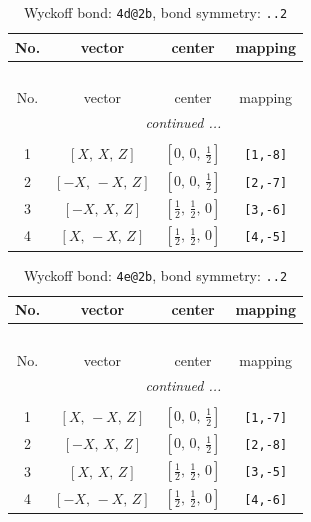 \documentclass[fleqn,8pt]{jsarticle}
\begin{document}
\begin{longtable}{cccc}
\caption{Wyckoff bond: {\tt 4d@2b}, bond symmetry: {\tt ..2}}
 \\
 \hline \hline
No. & vector & center & mapping \\ \hline \endfirsthead

\multicolumn{3}{l}{\tablename\ \thetable{}} \\
 \hline \hline
No. & vector & center & mapping \\ \hline \endhead

 \hline \hline
\multicolumn{3}{r}{\footnotesize\it continued ...} \\ \endfoot

 \hline \hline
\multicolumn{3}{r}{} \\ \endlastfoot

1 & $\left[ X,\, X,\, Z \right]$ & $\left[ 0,\, 0,\, \frac{1}{2} \right]$ & {\tt [1,-8]} \\ \hline
2 & $\left[ - X,\, - X,\, Z \right]$ & $\left[ 0,\, 0,\, \frac{1}{2} \right]$ & {\tt [2,-7]} \\ \hline
3 & $\left[ - X,\, X,\, Z \right]$ & $\left[ \frac{1}{2},\, \frac{1}{2},\, 0 \right]$ & {\tt [3,-6]} \\ \hline
4 & $\left[ X,\, - X,\, Z \right]$ & $\left[ \frac{1}{2},\, \frac{1}{2},\, 0 \right]$ & {\tt [4,-5]} \\
\end{longtable}
\renewcommand{\arraystretch}{1.2}
\begin{longtable}{cccc}
\caption{Wyckoff bond: {\tt 4e@2b}, bond symmetry: {\tt ..2}}
 \\
 \hline \hline
No. & vector & center & mapping \\ \hline \endfirsthead

\multicolumn{3}{l}{\tablename\ \thetable{}} \\
 \hline \hline
No. & vector & center & mapping \\ \hline \endhead

 \hline \hline
\multicolumn{3}{r}{\footnotesize\it continued ...} \\ \endfoot

 \hline \hline
\multicolumn{3}{r}{} \\ \endlastfoot

1 & $\left[ X,\, - X,\, Z \right]$ & $\left[ 0,\, 0,\, \frac{1}{2} \right]$ & {\tt [1,-7]} \\ \hline
2 & $\left[ - X,\, X,\, Z \right]$ & $\left[ 0,\, 0,\, \frac{1}{2} \right]$ & {\tt [2,-8]} \\ \hline
3 & $\left[ X,\, X,\, Z \right]$ & $\left[ \frac{1}{2},\, \frac{1}{2},\, 0 \right]$ & {\tt [3,-5]} \\ \hline
4 & $\left[ - X,\, - X,\, Z \right]$ & $\left[ \frac{1}{2},\, \frac{1}{2},\, 0 \right]$ & {\tt [4,-6]} \\
\end{longtable}
\end{document}
